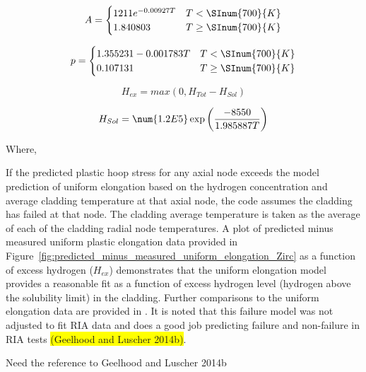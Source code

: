 \begin{equation}
    A = 
    \begin{cases}
        1211e^{- 0.00927T}  &  T < \SInum{700}{K} \\
        1.840803            &  T \geq \SInum{700}{K} \\
    \end{cases}
\end{equation}

\begin{equation}
    p = 
    \begin{cases}
        1.355231 - 0.001783T   &  T < \SInum{700}{K} \\
        0.107131               &  T \geq \SInum{700}{K} 
    \end{cases}
\end{equation}
        
\begin{equation}
    H_{ex} = max(0,H_{Tot} - H_{Sol}) 
\end{equation}

\begin{equation}
    H_{Sol} = \num{1.2E5}\exp\left( \frac{- 8550}{1.985887T} \right)
\end{equation}

Where,

If the predicted plastic hoop stress for any axial node exceeds the model prediction of uniform
elongation based on the hydrogen concentration and average cladding temperature at that axial node,
the code assumes the cladding has failed at that node. The cladding average temperature is taken as
the average of each of the cladding radial node temperatures. A plot of predicted minus measured
uniform plastic elongation data provided in
Figure~\ref{fig:predicted_minus_measured_uniform_elongation_Zirc} as a function of excess hydrogen
($H_{ex}$) demonstrates that the uniform elongation model provides a reasonable fit as a function of
excess hydrogen level (hydrogen above the solubility limit) in the cladding. Further comparisons to
the uniform elongation data are provided in \cite{ref:Geelhood2008a}. It is noted
that this failure model was not adjusted to fit RIA data and does a good job predicting failure and
non-failure in RIA tests \colorbox{yellow}{(Geelhood and Luscher 2014b)}.

{\color{red}Need the reference to Geelhood and Luscher 2014b} 

